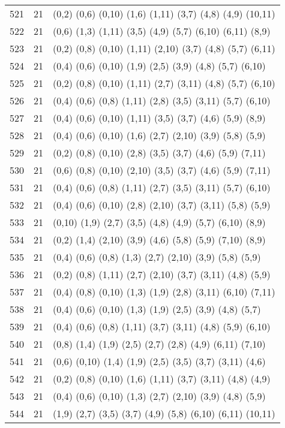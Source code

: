 {\begin{longtable}{lll}
521 & 21 & (0,2) (0,6) (0,10) (1,6) (1,11) (3,7) (4,8) (4,9) (10,11) \\
522 & 21 & (0,6) (1,3) (1,11) (3,5) (4,9) (5,7) (6,10) (6,11) (8,9) \\
523 & 21 & (0,2) (0,8) (0,10) (1,11) (2,10) (3,7) (4,8) (5,7) (6,11) \\
524 & 21 & (0,4) (0,6) (0,10) (1,9) (2,5) (3,9) (4,8) (5,7) (6,10) \\
525 & 21 & (0,2) (0,8) (0,10) (1,11) (2,7) (3,11) (4,8) (5,7) (6,10) \\
526 & 21 & (0,4) (0,6) (0,8) (1,11) (2,8) (3,5) (3,11) (5,7) (6,10) \\
527 & 21 & (0,4) (0,6) (0,10) (1,11) (3,5) (3,7) (4,6) (5,9) (8,9) \\
528 & 21 & (0,4) (0,6) (0,10) (1,6) (2,7) (2,10) (3,9) (5,8) (5,9) \\
529 & 21 & (0,2) (0,8) (0,10) (2,8) (3,5) (3,7) (4,6) (5,9) (7,11) \\
530 & 21 & (0,6) (0,8) (0,10) (2,10) (3,5) (3,7) (4,6) (5,9) (7,11) \\
531 & 21 & (0,4) (0,6) (0,8) (1,11) (2,7) (3,5) (3,11) (5,7) (6,10) \\
532 & 21 & (0,4) (0,6) (0,10) (2,8) (2,10) (3,7) (3,11) (5,8) (5,9) \\
533 & 21 & (0,10) (1,9) (2,7) (3,5) (4,8) (4,9) (5,7) (6,10) (8,9) \\
534 & 21 & (0,2) (1,4) (2,10) (3,9) (4,6) (5,8) (5,9) (7,10) (8,9) \\
535 & 21 & (0,4) (0,6) (0,8) (1,3) (2,7) (2,10) (3,9) (5,8) (5,9) \\
536 & 21 & (0,2) (0,8) (1,11) (2,7) (2,10) (3,7) (3,11) (4,8) (5,9) \\
537 & 21 & (0,4) (0,8) (0,10) (1,3) (1,9) (2,8) (3,11) (6,10) (7,11) \\
538 & 21 & (0,4) (0,6) (0,10) (1,3) (1,9) (2,5) (3,9) (4,8) (5,7) \\
539 & 21 & (0,4) (0,6) (0,8) (1,11) (3,7) (3,11) (4,8) (5,9) (6,10) \\
540 & 21 & (0,8) (1,4) (1,9) (2,5) (2,7) (2,8) (4,9) (6,11) (7,10) \\
541 & 21 & (0,6) (0,10) (1,4) (1,9) (2,5) (3,5) (3,7) (3,11) (4,6) \\
542 & 21 & (0,2) (0,8) (0,10) (1,6) (1,11) (3,7) (3,11) (4,8) (4,9) \\
543 & 21 & (0,4) (0,6) (0,10) (1,3) (2,7) (2,10) (3,9) (4,8) (5,9) \\
544 & 21 & (1,9) (2,7) (3,5) (3,7) (4,9) (5,8) (6,10) (6,11) (10,11) \\

\end{longtable}}
